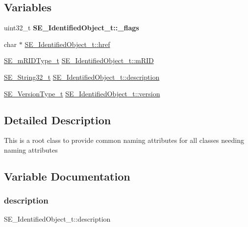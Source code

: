 \subsection*{Variables}
\begin{DoxyCompactItemize}
\item 
\mbox{\label{group__IdentifiedObject_ga9b83511d3f44f8f23b394dd4ab8a51b4}} 
uint32\+\_\+t {\bfseries S\+E\+\_\+\+Identified\+Object\+\_\+t\+::\+\_\+flags}
\item 
char $\ast$ \hyperlink{group__IdentifiedObject_gaa38c752b4716c2365e11d7afd8495be1}{S\+E\+\_\+\+Identified\+Object\+\_\+t\+::href}
\item 
\hyperlink{group__mRIDType_gac74622112f3a388a2851b2289963ba5e}{S\+E\+\_\+m\+R\+I\+D\+Type\+\_\+t} \hyperlink{group__IdentifiedObject_ga2f6a112da8cb63840db553c07d6f5429}{S\+E\+\_\+\+Identified\+Object\+\_\+t\+::m\+R\+ID}
\item 
\hyperlink{group__String32_gac9f59b06b168b4d2e0d45ed41699af42}{S\+E\+\_\+\+String32\+\_\+t} \hyperlink{group__IdentifiedObject_ga413d941623baaef9b40a6fb8dac29328}{S\+E\+\_\+\+Identified\+Object\+\_\+t\+::description}
\item 
\hyperlink{group__VersionType_ga4b8d27838226948397ed99f67d46e2ae}{S\+E\+\_\+\+Version\+Type\+\_\+t} \hyperlink{group__IdentifiedObject_gaffcdf964702f132d4f4078cc4864d594}{S\+E\+\_\+\+Identified\+Object\+\_\+t\+::version}
\end{DoxyCompactItemize}


\subsection{Detailed Description}
This is a root class to provide common naming attributes for all classes needing naming attributes 

\subsection{Variable Documentation}
\mbox{\label{group__IdentifiedObject_ga413d941623baaef9b40a6fb8dac29328}} 
\subsubsection{\texorpdfstring{description}{description}}
{\footnotesize\ttfamily S\+E\+\_\+\+Identified\+Object\+\_\+t\+::description}

